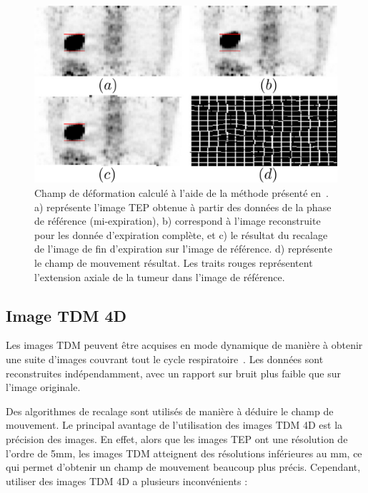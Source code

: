 \begin{figure}[h!]
	\begin{center}
		\includegraphics[width=12cm]{images/champDeformBai2}
	\end{center}
	\caption{Champ de déformation calculé à l'aide de la méthode présenté en~\cite{bai2009regularized}. a) représente l'image TEP obtenue à partir des données de la phase de référence  (mi-expiration), b) correspond à l'image reconstruite pour les donnée d'expiration complète, et c) le résultat du recalage de l'image de fin d'expiration sur l'image de référence. d) représente le champ de mouvement résultat. Les traits rouges représentent l'extension axiale de la tumeur dans l'image de référence.} 
	\label{fig:champMouvementBai}
\end{figure}

\subsection{Image TDM 4D}

Les images TDM peuvent être acquises en mode dynamique de manière à obtenir une suite d'images couvrant tout le cycle respiratoire~\cite{lamare2007list, qiao2006motion}. Les données sont reconstruites indépendamment, avec un rapport sur bruit plus faible que sur l'image originale. 

Des algorithmes de recalage sont utilisés de manière à déduire le champ de mouvement. Le principal avantage de l'utilisation des images TDM 4D est la précision des images. En effet, alors que les images TEP ont une résolution de l'ordre de 5mm, les images TDM atteignent des résolutions inférieures au mm, ce qui permet d'obtenir un champ de mouvement beaucoup plus précis. Cependant, utiliser des images TDM 4D a plusieurs inconvénients :

